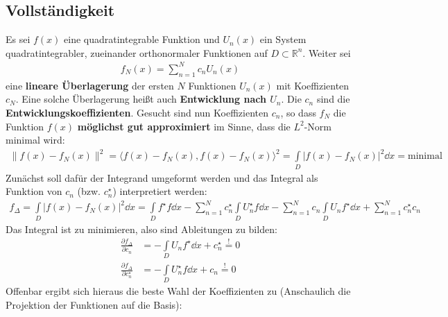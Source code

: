   \subsection{Vollständigkeit}
		  Es sei $f(x)$ eine quadratintegrable Funktion und $U_n(x)$ ein System quadratintegrabler, zueinander orthonormaler Funktionen auf $D \subset \mathbb{R}^n$.
		   Weiter sei
		        \begin{equation}\begin{split}
				        f_N(x) = \sum_{n=1}^N c_n U_n(x)
			        \end{split}\end{equation}
		        eine \textbf{lineare Überlagerung} der ersten $N$ Funktionen $U_n(x)$ mit Koeffizienten $c_N$. Eine solche Überlagerung heißt auch \textbf{Entwicklung nach $U_n$}. Die $c_n$ sind die \textbf{Entwicklungskoeffizienten}.
		   Gesucht sind nun Koeffizienten $c_n$, so dass $f_N$ die Funktion $f(x)$ \textbf{möglichst gut approximiert} im Sinne, dass die $L^2$-Norm minimal wird:
		        \begin{equation}\begin{split}
				        \| f(x) - f_N(x)\|^2 = \langle f(x) - f_N(x), f(x) - f_N(x) \rangle^2 = \int\limits_D |f(x) - f_N(x)|^2 \dd x = \text{minimal}
			        \end{split}\end{equation}
		   Zunächst soll dafür der Integrand umgeformt werden und das Integral als Funktion von $c_n$ (bzw. $c_n^\star$) interpretiert werden:
		        \begin{equation}\begin{split}
				        f_\Delta =\int\limits_D |f(x) - f_N(x)|^2 \dd x = \int\limits_D f^\star f \dd x -\sum_{n=1}^N c_n^\star \int\limits_D U_n^\star f \dd x -\sum_{n=1}^N c_n \int\limits_D U_n f^\star \dd x + \sum_{n=1}^N c_n^\star c_n
			        \end{split}\end{equation}
		   Das Integral ist zu minimieren, also sind Ableitungen zu bilden:
		        \begin{equation}\begin{split}
				        \frac{\partial f_\Delta}{\partial c_n} &= - \int\limits_D U_n f^\star \dd x + c_n^\star \stackrel{!}{=} 0\\
				        \frac{\partial f_\Delta}{\partial c_n^\star} &= - \int\limits_D U_n^\star f \dd x + c_n \stackrel{!}{=} 0
			        \end{split}\end{equation}
		   Offenbar ergibt sich hieraus die beste Wahl der Koeffizienten zu (Anschaulich die Projektion der Funktionen auf die Basis):
